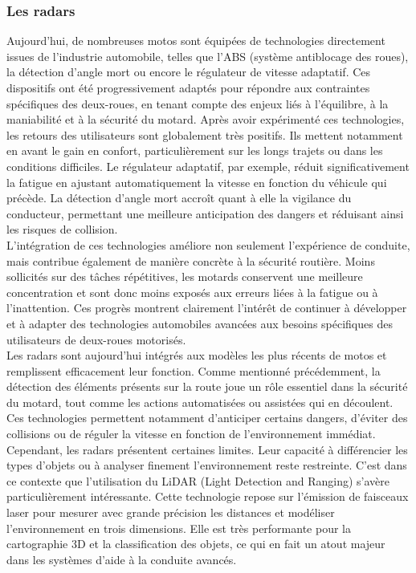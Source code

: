 \subsubsection{Les radars}
Aujourd'hui, de nombreuses motos sont équipées de technologies directement issues de l’industrie automobile, telles que l’ABS (système antiblocage des roues), la détection d’angle mort ou encore le régulateur de vitesse adaptatif. Ces dispositifs ont été progressivement adaptés pour répondre aux contraintes spécifiques des deux-roues, en tenant compte des enjeux liés à l'équilibre, à la maniabilité et à la sécurité du motard.
Après avoir expérimenté ces technologies, les retours des utilisateurs sont globalement très positifs. Ils mettent notamment en avant le gain en confort, particulièrement sur les longs trajets ou dans les conditions difficiles. Le régulateur adaptatif, par exemple, réduit significativement la fatigue en ajustant automatiquement la vitesse en fonction du véhicule qui précède. La détection d’angle mort accroît quant à elle la vigilance du conducteur, permettant une meilleure anticipation des dangers et réduisant ainsi les risques de collision.\\
L'intégration de ces technologies améliore non seulement l’expérience de conduite, mais contribue également de manière concrète à la sécurité routière. Moins sollicités sur des tâches répétitives, les motards conservent une meilleure concentration et sont donc moins exposés aux erreurs liées à la fatigue ou à l’inattention. Ces progrès montrent clairement l'intérêt de continuer à développer et à adapter des technologies automobiles avancées aux besoins spécifiques des utilisateurs de deux-roues motorisés.\\
Les radars sont aujourd’hui intégrés aux modèles les plus récents de motos et remplissent efficacement leur fonction. Comme mentionné précédemment, la détection des éléments présents sur la route joue un rôle essentiel dans la sécurité du motard, tout comme les actions automatisées ou assistées qui en découlent. Ces technologies permettent notamment d’anticiper certains dangers, d’éviter des collisions ou de réguler la vitesse en fonction de l’environnement immédiat.\\
Cependant, les radars présentent certaines limites. Leur capacité à différencier les types d’objets ou à analyser finement l’environnement reste restreinte. C’est dans ce contexte que l’utilisation du LiDAR (Light Detection and Ranging) s’avère particulièrement intéressante. Cette technologie repose sur l’émission de faisceaux laser pour mesurer avec grande précision les distances et modéliser l’environnement en trois dimensions. Elle est très performante pour la cartographie 3D et la classification des objets, ce qui en fait un atout majeur dans les systèmes d’aide à la conduite avancés.\\


